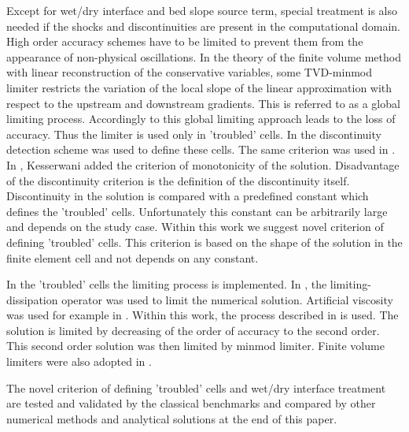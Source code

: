 Except for wet/dry interface and bed slope source term, special
treatment is also needed if the shocks and discontinuities are present
in the computational domain. High order accuracy schemes have to be
limited to prevent them from the appearance of non-physical
oscillations. In the theory of the finite volume method with linear
reconstruction of the conservative variables, some TVD-minmod limiter
restricts the variation of the local slope of the linear approximation
with respect to the upstream and downstream gradients. This is
referred to as a global limiting process. Accordingly to
\cite{krivodonova2004,shu2005} this global limiting approach leads to
the loss of accuracy. Thus the limiter is used only in 'troubled'
cells. In \cite{krivodonova2004} the discontinuity detection scheme
was used to define these cells. The same criterion was used in
\cite{Ambati2007452}. In \cite{kesserwani2015}, Kesserwani added the
criterion of monotonicity of the solution. Disadvantage of the
discontinuity criterion is the definition of the discontinuity
itself. Discontinuity in the solution is compared with a predefined
constant which defines the 'troubled' cells. Unfortunately this
constant can be arbitrarily large and depends on the study case.
Within this work we suggest novel criterion of defining 'troubled'
cells. This criterion is based on the shape of the solution in the
finite element cell and not depends on any constant.

In the 'troubled' cells the limiting process is implemented. In
\cite{JAFFRE1995,Ambati2007452}, the limiting-dissipation operator was
used to limit the numerical solution. Artificial viscosity was used
for example in \cite{cesenek2013, bublik2011,Bublik2015329}. Within
this work, the process described in \cite{Cockburn1989b} is used. The
solution is limited by decreasing of the order of accuracy to the
second order. This second order solution was then limited by minmod
limiter. Finite volume limiters were also adopted in \cite{yang2009}.

The novel criterion of defining 'troubled' cells and wet/dry interface
treatment are tested and validated by the classical benchmarks and
compared by other numerical methods and analytical solutions at the
end of this paper.
